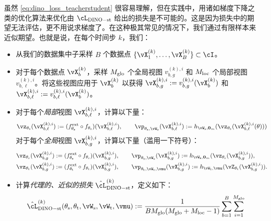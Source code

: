\documentclass[../../book-main.tex]{subfiles}
\begin{document}
虽然 \eqref{eq:dino_loss_teacherstudent} 很容易理解，但在实践中，用诸如梯度下降之类的优化算法来优化由 \(\cL_{\dino{}-\student\teacher}\) 给出的损失是不可能的。这是因为损失中的期望无法评估，更不用说求梯度了。在这种极其常见的情况下，我们通过有限样本来近似期望。也就是说，在每个时间步 \(k\)，我们：
\begin{itemize}
    \item 从我们的数据集中子采样 \(B\) 个数据点 \(\{\vX_{1}^{(k)}, \dots, \vX_{B}^{(k)}\} \subset \cI\)。
    \item 对于每个数据点 \(\vX_{b}^{(k)}\)，采样 \(M_{\mathrm{glo}}\) 个全局视图 \(v_{b, g}^{(k), i}\) 和 \(M_{\mathrm{loc}}\) 个局部视图 \(v_{b, \ell}^{(k), i}\)。将这些视图应用于 \(\vX_{b}^{(k)}\) 以获得 \(\vX_{b, g}^{(k), i} := v_{b, g}^{(k), i}(\vX_{b}^{(k)})\) 和 \(\vX_{b, \ell}^{(k), i} := v_{b, \ell}^{(k), i}(\vX_{b}^{(k)})\)。
    \item 对于每个\textit{局部}视图 \(\vX_{b, \ell}^{(k), i}\)，计算以下量：
    \begin{equation}
        \vz_{\theta_{\student}}(\vX_{b, \ell}^{(k), i}) := (f_{\theta_{\student}}^{\ext} \circ f_{\theta_{\student}})(\vX_{b, \ell}^{(k), i}), \qquad \vp_{\theta_{\student}, \vW_{\student}}(\vX_{b, \ell}^{(k), i}) := h_{\vW_{\student}, \vzero_{m}}(\vz_{\theta_{\student}}(\vX_{b, \ell}^{(k), i}(\theta)))
    \end{equation}
    对于每个\textit{全局}视图 \(\vX_{b, g}^{(k), i}\)，计算以下量（滥用一下符号）：
    \begin{align}
        &\vz_{\theta_{\student}}(\vX_{b, g}^{(k), i}) := (f_{\theta_{\student}}^{\ext} \circ f_{\theta_{\student}})(\vX_{b, g}^{(k), i}), \qquad \vp_{\theta_{\student}, \vW_{\student}}(\vX_{b, g}^{(k), i}) := h_{\vW_{\student}, \vzero_{m}}(\vz_{\theta_{\student}}(\vX_{b, g}^{(k), i})), \\
        &\vz_{\theta_{\teacher}}(\vX_{b, g}^{(k), i}) := (f_{\theta_{\teacher}}^{\ext} \circ f_{\theta_{\teacher}})(\vX_{b, g}^{(k), i}), \qquad \vp_{\theta_{\teacher}, \vW_{\teacher}, \vmu}(\vX_{b, g}^{(k), i}) := h_{\vW_{\teacher}, \vmu}(\vZ_{\theta_{\teacher}}(\vX_{b, g}^{(k), i})).
    \end{align}
    \item 计算\textit{代理的、近似的损失} \(\hat{\cL}_{\dino-\student\teacher}^{(k)}\)，定义如下：
    \begin{align}\label{eq:dino_loss_teacherstudent_empirical}
        &\hat{\cL}_{\dino{}-\student\teacher}^{(k)}(\theta_{\student}, \theta_{\teacher}, \vW_{\student}, \vW_{\teacher}, \vmu) :=
        \frac{1}{BM_{\glo}(M_{\glo} + M_{\loc} - 1)}\sum_{b = 1}^{B}\sum_{i = 1}^{M_{\glo}}\\

\end{align}
\end{itemize}
\end{document}
